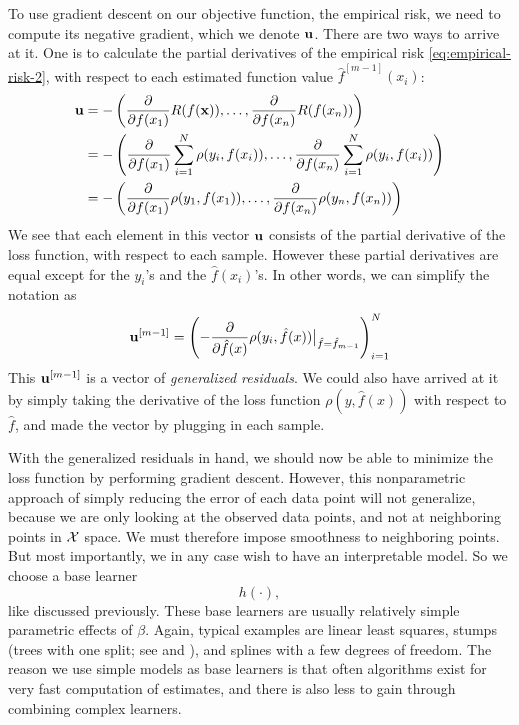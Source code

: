 To use gradient descent on our objective function, the empirical risk, we need to compute its negative gradient, which we denote $\mathbf{u}$. There are two ways to arrive at it. One is to calculate the partial derivatives of the empirical risk \eqref{eq:empirical-risk-2}, with respect to each estimated function value $\hat{f}^{[m-1]}(x_i)$:
\begin{align}
    \mathbf{u}&=-\left(\frac{\partial}{\partial f(x_1)}R(f(\mathbf{x})),\ldots,\frac{\partial}{\partial f(x_n)}R(f(x_n))\right) \\
    &=-\left(\frac{\partial}{\partial f(x_1)}\sum_{i=1}^N\rho(y_i, f(x_i)),\ldots,\frac{\partial}{\partial f(x_n)}\sum_{i=1}^N\rho(y_i, f(x_i))\right) \\
    &=-\left(\frac{\partial}{\partial f(x_1)}\rho(y_1, f(x_1)),\ldots,\frac{\partial}{\partial f(x_n)}\rho(y_n, f(x_n))\right)
\end{align}
We see that each element in this vector $\mathbf{u}$ consists of the partial derivative of the loss function, with respect to each sample. However these partial derivatives are equal except for the $y_i$'s and the $\hat{f}(x_i)$'s. In other words, we can simplify the notation as
\begin{equation}
    \mathbf{u}^{[m-1]}=\left(-\frac{\partial}{\partial \hat{f}(x)}\rho(y_i, \hat{f}(x))\big\rvert_{\hat{f}=\hat{f}_{m-1}}\right)_{i=1}^N
\end{equation}
This $\mathbf{u}^{[m-1]}$ is a vector of \textit{generalized residuals}. We could also have arrived at it by simply taking the derivative of the loss function $\rho(y,\hat{f}(x))$ with respect to $\hat{f}$, and made the vector by plugging in each sample.

With the generalized residuals in hand, we should now be able to minimize the loss function by performing gradient descent. However, this nonparametric approach of simply reducing the error of each data point will not generalize, because we are only looking at the observed data points, and not at neighboring points in $\mathcal{X}$ space. We must therefore impose smoothness to neighboring points. But most importantly, we in any case wish to have an interpretable model. So we choose a base learner
\begin{equation}
    h(\cdot),
\end{equation}
like discussed previously. These base learners are usually relatively simple parametric effects of $\beta$. Again, typical examples are linear least squares, stumps (trees with one split; see \citet{buhlmann2007} and \citet{ESL}), and splines with a few degrees of freedom. The reason we use simple models as base learners is that often algorithms exist for very fast computation of estimates, and there is also less to gain through combining complex learners.

